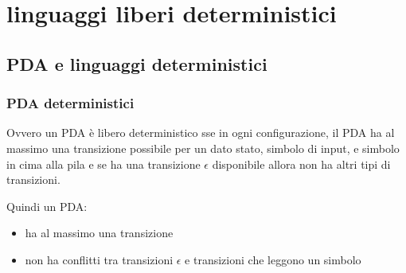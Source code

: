 \chapter{linguaggi liberi deterministici}

\section{PDA e linguaggi deterministici}
\subsection{PDA deterministici}
Ovvero un PDA è libero deterministico sse in ogni configurazione, il PDA ha al massimo una transizione possibile per un dato stato, simbolo di input, e simbolo in cima alla pila e se ha una transizione $\epsilon$ disponibile allora non ha altri tipi di transizioni.

Quindi un PDA:
\begin{itemize}
    \item ha al massimo una transizione
    \item non ha conflitti tra transizioni $\epsilon$ e transizioni che leggono un simbolo
\end{itemize}
